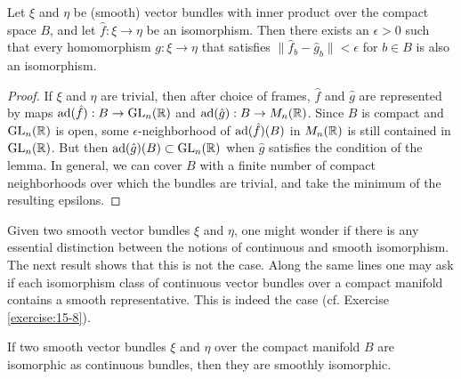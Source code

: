\begin{lemma}\label{lemma:15-16}
  Let $\xi$ and $\eta$ be (smooth) vector bundles with inner product over
  the compact space $B$, and let $\hat f:\xi\to \eta$ be an isomorphism. Then there exists an
  $\epsilon > 0$ such that every homomorphism $g:\xi\to\eta$ that satisfies $\|\hat f_b-\hat g_b\|<\epsilon$ 
  for $b\in B$ is also an isomorphism.  
\end{lemma}

\begin{proof}
  If $\xi$ and $\eta$ are trivial, then after choice of frames, $\hat f$ and $\hat g$ are represented
  by maps $\mathrm{ad}(\hat f):B\to \mathrm{GL}_n({\mathbb{R}})$ and $\mathrm{ad}(\hat g):B\to M_n({\mathbb{R}})$. Since $B$ is 
  compact and $\mathrm{GL}_n({\mathbb{R}})$ is open, some $\epsilon$-neighborhood of $\mathrm{ad}(\hat f)(B)$ in $M_n({\mathbb{R}})$ 
  is still contained in $\mathrm{GL}_n({\mathbb{R}})$. But then $\mathrm{ad}(\hat g)(B)\subset \mathrm{GL}_n({\mathbb{R}})$ when $\hat g$ 
  satisfies the condition of the lemma. In general, we can cover $B$ with a finite number of compact 
  neighborhoods over which the bundles are trivial, and take the minimum of the resulting epsilons.
\end{proof}

Given two smooth vector bundles $\xi$ and $\eta$, one might wonder if there is any
essential distinction between the notions of continuous and smooth isomorphism.
The next result shows that this is not the case. Along the same lines one may ask
if each isomorphism class of continuous vector bundles over a compact manifold
contains a smooth representative. This is indeed the case (cf. Exercise \ref{exercise:15-8}).

\begin{lemma}\label{lemma:15-17}
  If two smooth vector bundles $\xi$ and $\eta$ over the compact manifold
  $B$ are isomorphic as continuous bundles, then they are smoothly isomorphic.
\end{lemma}

